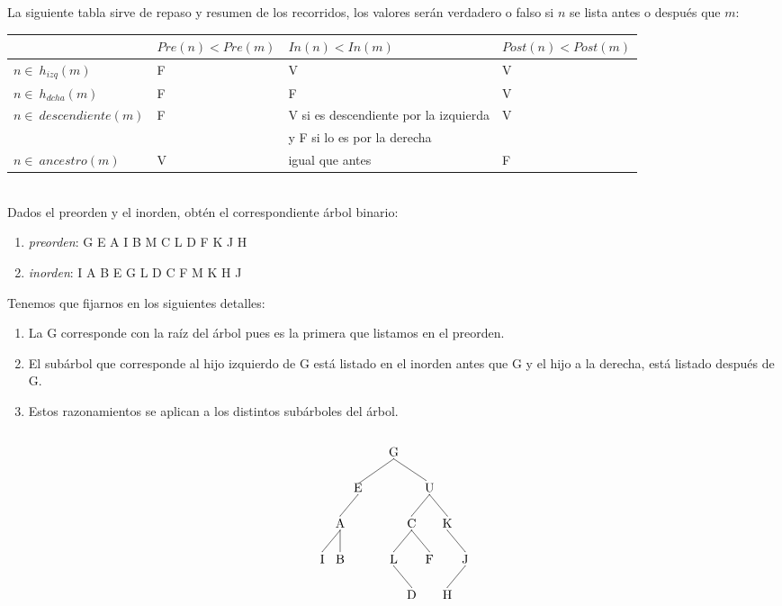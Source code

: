 \documentclass[10pt,a4paper,spanish]{report}
\begin{document}
\noindent
La siguiente tabla sirve de repaso y resumen de los recorridos, los valores serán verdadero o falso si $n$ se lista antes o después que $m$: \\[0.5cm]
\begin{table}[H]
\scriptsize
\begin{tabular}{|l|| l| l| l|} 
\hline
& $Pre(n) < Pre(m)$ & $In(n) < In(m)$ & $Post(n) < Post(m)$ \\
\hline
$n\in ~h_{izq}(m)$ & F & V & V \\ \hline
$n\in ~h_{dcha}(m)$ & F & F & V \\ \hline
\multirow{2}{*}{$n\in ~descendiente(m)$} &\multirow{2}{*}{F} & V si es descendiente por la izquierda & \multirow{2}{*}{V}\\
~                       &~  & y F si lo es por la derecha}&  \\\hline
$n\in ~ancestro(m)$ & V & igual que antes & F \\\hline
\end{tabular} 
\end{table}\\[0.5cm]

\noindent
Dados el preorden y el inorden, obtén el correspondiente árbol binario:
\begin{enumerate}[$\spadesuit$]
\item \textit{\textcolor[rgb]{0.3,0.4,0.8}{preorden}}: G E A I B M C L D F K J H
\item \textit{\textcolor[rgb]{0.3,0.4,0.8}{inorden}}: I A B E G L D C F M K H J
\end{enumerate}

\noindent
Tenemos que fijarnos en los siguientes detalles:
\begin{enumerate}[1.]
\item La G corresponde con la raíz del árbol pues es la primera que listamos en el preorden.
\item El subárbol que corresponde al hijo izquierdo de G está listado en el inorden antes que G y el hijo a la derecha, está listado después de G.
\item Estos razonamientos se aplican a los distintos subárboles del árbol.
\end{enumerate}

\[\begin{xy}
,(0,0)*+=<10mm>[]\txt<2cm>{G}
,(-10,-10)*+=<10mm>[]\txt<2cm>{E}
,(10,-10)*+=<10mm>[]\txt<2cm>{U}
,(-15,-20)*+=<10mm>[]\txt<2cm>{A}
,(5,-20)*+=<10mm>[]\txt<2cm>{C}
,(15,-20)*+=<10mm>[]\txt<2cm>{K}
,(0,-30)*+=<10mm>[]\txt<2cm>{L}
,(10,-30)*+=<10mm>[]\txt<2cm>{F}
,(-20,-30)*+=<10mm>[]\txt<2cm>{I}
,(-15,-30)*+=<10mm>[]\txt<2cm>{B}
,(5,-40)*+=<10mm>[]\txt<2cm>{D}
,(20,-30)*+=<10mm>[]\txt<2cm>{J}
,(15,-40)*+=<10mm>[]\txt<2cm>{H}

\ar@{-} (0,-2);(-10,-9)
\ar@{-} (0,-2);(9,-8)
\ar@{-} (-10,-12);(-15,-18)
\ar@{-} (10,-12);(5,-18)
\ar@{-} (10,-12);(15,-18)
\ar@{-} (5,-22);(0,-28)
\ar@{-} (5,-22);(10,-28)
\ar@{-} (-15,-22);(-20,-28)
\ar@{-} (-15,-22);(-15,-28)
\ar@{-} (0,-32);(5,-38)
\ar@{-} (15,-22);(20,-28)
\ar@{-} (20,-32);(15,-38)
\end{xy}\]
\end{document}
